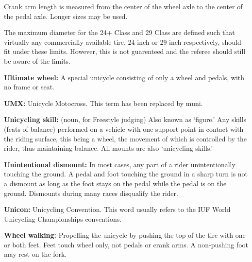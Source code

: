 Crank arm length is measured from the center of the wheel axle to the center of the pedal axle.
Longer sizes may be used.

The maximum diameter for the 24+ Class and 29 Class are defined such that virtually any commercially available tire, 24 inch or 29 inch respectively, should fit under these limits. However, this is not guarenteed and the referee should still be aware of the limits.

\textbf{Ultimate wheel:} A special unicycle consisting of only a wheel and pedals, with no frame or seat.

\textbf{UMX:} Unicycle Motocross.
This term has been replaced by muni.

\textbf{Unicycling skill:} (noun, for Freestyle judging) Also known as `figure.' Any skills (feats of balance) performed on a vehicle with one support point in contact with the riding surface, this being a wheel, the movement of which is controlled by the rider, thus maintaining balance.
All mounts are also `unicycling skills.'

\textbf{Unintentional dismount:} In most cases, any part of a rider unintentionally touching the ground.
A pedal and foot touching the ground in a sharp turn is not a dismount as long as the foot stays on the pedal while the pedal is on the ground.
Dismounts during many races disqualify the rider.

\textbf{Unicon:} Unicycling Convention.
This word usually refers to the IUF World Unicycling Championships conventions.

\textbf{Wheel walking:} Propelling the unicycle by pushing the top of the tire with one or both feet.
Feet touch wheel only, not pedals or crank arms.
A non-pushing foot may rest on the fork.
